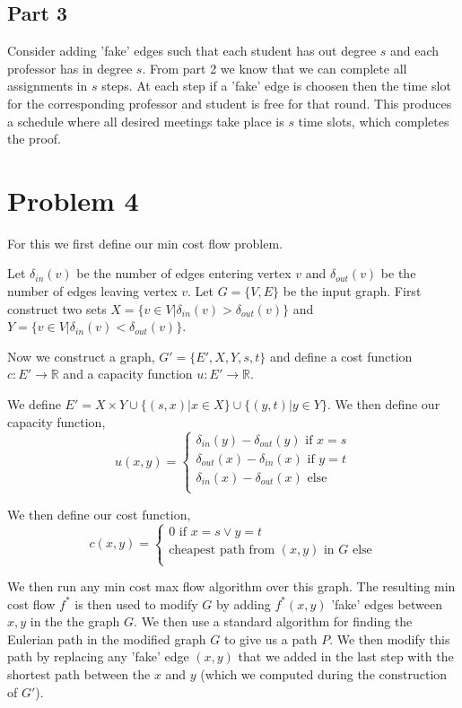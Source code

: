 \documentclass[a4paper]{article}
\newcommand{\indeg}[1]{\delta_{in}(#1)}
\newcommand{\outdeg}[1]{\delta_{out}(#1)}
\begin{document}
\subsection{Part 3}

Consider adding 'fake' edges such that each student has out degree $s$ and each professor has 
in degree $s$. From part 2 we know that we can complete all assignments in 
$s$ steps. At each step if a 'fake' edge is choosen then the time slot for the corresponding 
professor and student is free for that round. This produces a schedule where all desired meetings take
place is $s$ time slots, which completes the proof.


\section{Problem 4}
For this we first define our min cost flow problem. 

Let $\indeg{v}$ be the number of edges entering vertex $v$ and $\outdeg{v}$ be the number of edges leaving vertex $v$.
Let $G = \{V, E\}$ be the input graph.
First construct two sets $X = \{v \in V | \indeg{v} > \outdeg{v}\}$ and 
$Y = \{v \in V | \indeg{v} < \outdeg{v}\}$.

Now we construct a graph, $G' = \{E', X, Y, s, t\}$ and define a cost function $c : E' \rightarrow \mathds{R}$ and a 
capacity function $u : E' \rightarrow \mathds{R}$.

We define $E' = X \times Y \cup \{(s,x) | x \in X\} \cup \{(y,t) | y \in Y\}$.
We then define our capacity function, 
$$
u(x,y) = 
\begin{cases} 
	\indeg{y} - \outdeg{y} \text{ if } x = s\\
	\outdeg{x} - \indeg{x} \text{ if } y = t\\
	\indeg{x} - \outdeg{x} \text{ else }\\
\end{cases}
$$

We then define our cost function,
$$
c(x,y) = 
\begin{cases} 
	0 \text{ if } x = s \lor y = t\\
	\text{cheapest path from $(x,y)$ in $G$ else}\\ 
\end{cases}
$$

We then run any min cost max flow algorithm over this graph. The resulting min cost flow $f^*$ is 
then used to modify $G$ by adding $f^*(x,y)$ 'fake' edges between $x,y$ in the the graph $G$. We then use 
a standard algorithm for finding the Eulerian path in the modified graph $G$ to give us a path
$P$. We then modify this path by replacing any 'fake' edge $(x,y)$ that we added in the last step with 
the shortest path between the $x$ and $y$ (which we computed during the construction of $G'$). 
\end{document}
